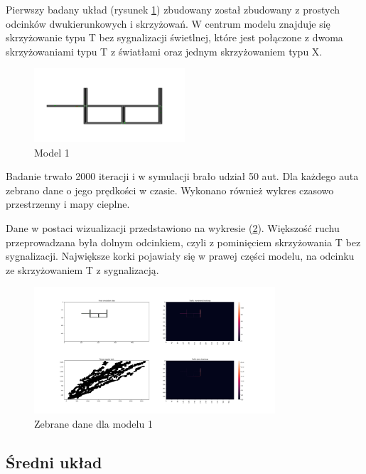 \documentclass{article}
\begin{document}
Pierwszy badany układ (rysunek \ref{fig:model_maly}) zbudowany został zbudowany z prostych odcinków dwukierunkowych i skrzyżowań. W centrum modelu znajduje się skrzyżowanie typu T bez sygnalizacji świetlnej, które jest połączone z dwoma skrzyżowaniami typu T z światłami oraz jednym skrzyżowaniem typu X. 

\begin{figure}[H]
    \centering
    \includegraphics[width=0.5\textwidth]{images/modele/small.png}
    \caption{Model 1}
    \label{fig:model_maly}
\end{figure}

Badanie trwało 2000 iteracji i w symulacji brało udział 50 aut. Dla każdego auta zebrano dane o jego prędkości w czasie. Wykonano również wykres czasowo przestrzenny i mapy cieplne. 

Dane w postaci wizualizacji przedstawiono na wykresie (\ref{fig:dane_maly}). Większość ruchu przeprowadzana była dolnym odcinkiem, czyli z pominięciem skrzyżowania T bez sygnalizacji. Największe korki pojawiały się w prawej części modelu, na odcinku ze skrzyżowaniem T z sygnalizacją.

\begin{figure}[H]
    \centering
    \includegraphics[width=0.8\textwidth]{images/Figure_1.png}
    \caption{Zebrane dane dla modelu 1}
    \label{fig:dane_maly}
\end{figure}


\subsection{Średni układ}
\end{document}
